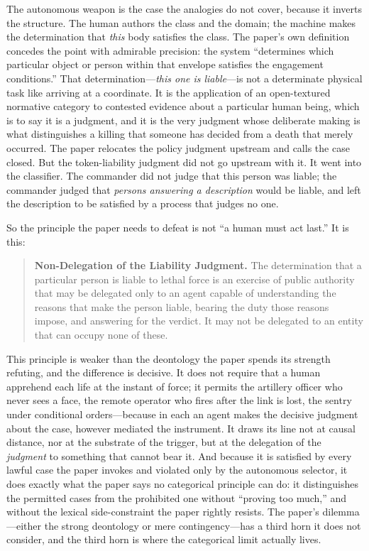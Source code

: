\documentclass[11pt]{article}
\begin{document}
The autonomous weapon is the case the analogies do not cover, because it inverts the structure. The human authors the class and the domain; the machine makes the determination that \emph{this} body satisfies the class. The paper's own definition concedes the point with admirable precision: the system ``determines which particular object or person within that envelope satisfies the engagement conditions.'' That determination---\emph{this one is liable}---is not a determinate physical task like arriving at a coordinate. It is the application of an open-textured normative category to contested evidence about a particular human being, which is to say it is a judgment, and it is the very judgment whose deliberate making is what distinguishes a killing that someone has decided from a death that merely occurred. The paper relocates the policy judgment upstream and calls the case closed. But the token-liability judgment did not go upstream with it. It went into the classifier. The commander did not judge that this person was liable; the commander judged that \emph{persons answering a description} would be liable, and left the description to be satisfied by a process that judges no one.

So the principle the paper needs to defeat is not ``a human must act last.'' It is this:

\begin{quote}
\textbf{Non-Delegation of the Liability Judgment.} The determination that a particular person is liable to lethal force is an exercise of public authority that may be delegated only to an agent capable of understanding the reasons that make the person liable, bearing the duty those reasons impose, and answering for the verdict. It may not be delegated to an entity that can occupy none of these.
\end{quote}

This principle is weaker than the deontology the paper spends its strength refuting, and the difference is decisive. It does not require that a human apprehend each life at the instant of force; it permits the artillery officer who never sees a face, the remote operator who fires after the link is lost, the sentry under conditional orders---because in each an agent makes the decisive judgment about the case, however mediated the instrument. It draws its line not at causal distance, nor at the substrate of the trigger, but at the delegation of the \emph{judgment} to something that cannot bear it. And because it is satisfied by every lawful case the paper invokes and violated only by the autonomous selector, it does exactly what the paper says no categorical principle can do: it distinguishes the permitted cases from the prohibited one without ``proving too much,'' and without the lexical side-constraint the paper rightly resists. The paper's dilemma---either the strong deontology or mere contingency---has a third horn it does not consider, and the third horn is where the categorical limit actually lives.
\end{document}
